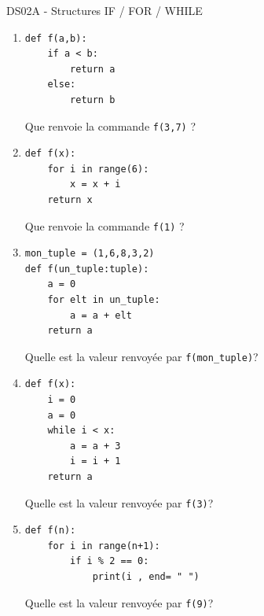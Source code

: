 \documentclass[a4paper,12pt,openany]{book}
\begin{document}
\begin{center}\begin{large}
DS02A - Structures IF / FOR / WHILE
\end{large}\end{center}



\begin{enumerate}
	\item 
	
	\begin{lstlisting}[numbers=none]
def f(a,b):
	if a < b:
		return a
	else:
		return b
\end{lstlisting}
	
	Que renvoie la commande \verb+f(3,7)+ ? \dotfill
	
	\medskip
	
	\item 
	\begin{lstlisting}[numbers=none]
def f(x):
	for i in range(6):
		x = x + i
	return x
\end{lstlisting}
	
	Que renvoie la commande \verb+f(1)+ ? \dotfill

	\medskip
	
	\item 
	\begin{lstlisting}[numbers=none]
mon_tuple = (1,6,8,3,2)
def f(un_tuple:tuple):
	a = 0
	for elt in un_tuple:
		a = a + elt
	return a
\end{lstlisting}
	
	Quelle est la valeur renvoyée par \verb+f(mon_tuple)+? \dotfill

	\medskip
	
	\item 
	\begin{lstlisting}[numbers=none]
def f(x):
	i = 0
	a = 0
	while i < x:
		a = a + 3
		i = i + 1
	return a
\end{lstlisting}
	
	Quelle est la valeur renvoyée par \verb+f(3)+? \dotfill
	
	\medskip
	
	\item 
	\begin{lstlisting}[numbers=none]
def f(n):
	for i in range(n+1):
		if i % 2 == 0:
			print(i , end= " ")
\end{lstlisting}
	
	Quelle est la valeur renvoyée par \verb+f(9)+? \dotfill
	
	
	\newpage
	

\end{enumerate}
\end{document}
